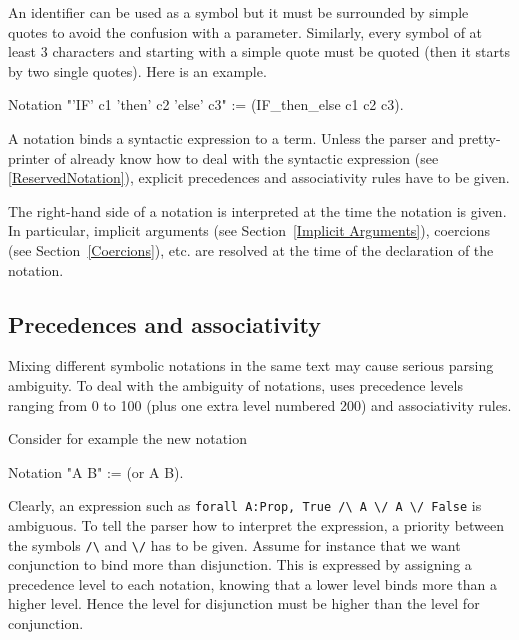 An identifier can be used as a symbol but it must be surrounded by
simple quotes to avoid the confusion with a parameter. Similarly,
every symbol of at least 3 characters and starting with a simple quote
must be quoted (then it starts by two single quotes). Here is an example.

\begin{coq_example*}
Notation "'IF' c1 'then' c2 'else' c3" := (IF_then_else c1 c2 c3).
\end{coq_example*}


A notation binds a syntactic expression to a term. Unless the parser
and pretty-printer of {\Coq} already know how to deal with the
syntactic expression (see \ref{ReservedNotation}), explicit precedences and
associativity rules have to be given.

\Rem The right-hand side of a notation is interpreted at the time the
notation is given. In particular, implicit arguments (see
Section~\ref{Implicit Arguments}), coercions (see
Section~\ref{Coercions}), etc. are resolved at the time of the
declaration of the notation.

\subsection[Precedences and associativity]{Precedences and associativity
}

Mixing different symbolic notations in the same text may cause serious
parsing ambiguity. To deal with the ambiguity of notations, {\Coq}
uses precedence levels ranging from 0 to 100 (plus one extra level
numbered 200) and associativity rules.

Consider for example the new notation

\begin{coq_example*}
Notation "A \/ B" := (or A B).
\end{coq_example*}

Clearly, an expression such as {\tt forall A:Prop, True \verb=/\= A \verb=\/=
A \verb=\/= False} is ambiguous. To tell the {\Coq} parser how to
interpret the expression, a priority between the symbols \verb=/\= and
\verb=\/= has to be given. Assume for instance that we want conjunction
to bind more than disjunction. This is expressed by assigning a
precedence level to each notation, knowing that a lower level binds
more than a higher level.  Hence the level for disjunction must be
higher than the level for conjunction.


